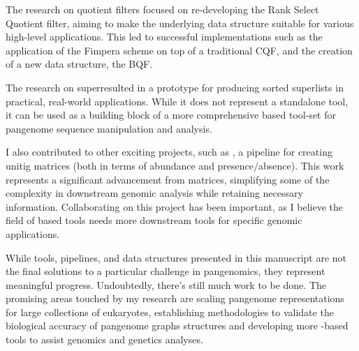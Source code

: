 The research on quotient filters focused on re-developing the Rank Select Quotient filter, aiming to make the underlying data structure suitable for various high-level applications. This led to successful implementations such as the application of the Fimpera scheme on top of a traditional CQF, and the creation of a new data structure, the BQF.

The research on super\kmers resulted in a prototype for producing sorted super\kmer lists in practical, real-world applications. While it does not represent a standalone tool, it can be used as a building block of a more comprehensive \kmer based tool-set for pangenome sequence manipulation and analysis.

I also contributed to other exciting projects, such as \muset, a pipeline for creating unitig matrices (both in terms of abundance and presence/absence). This work represents a significant advancement from \kmer matrices, simplifying some of the complexity in downstream genomic analysis while retaining necessary information. Collaborating on this project has been important, as I believe the field of \kmer based tools needs more downstream tools for specific genomic applications.

While tools, pipelines, and data structures presented in this manuscript are not the final solutions to a particular challenge in pangenomics, they represent meaningful progress. Undoubtedly, there’s still much work to be done. The promising areas touched by my research are scaling pangenome representations for large collections of eukaryotes, establishing methodologies to validate the biological accuracy of pangenome graphs structures and developing more \kmer-based tools to assist genomics and genetics analyses.

